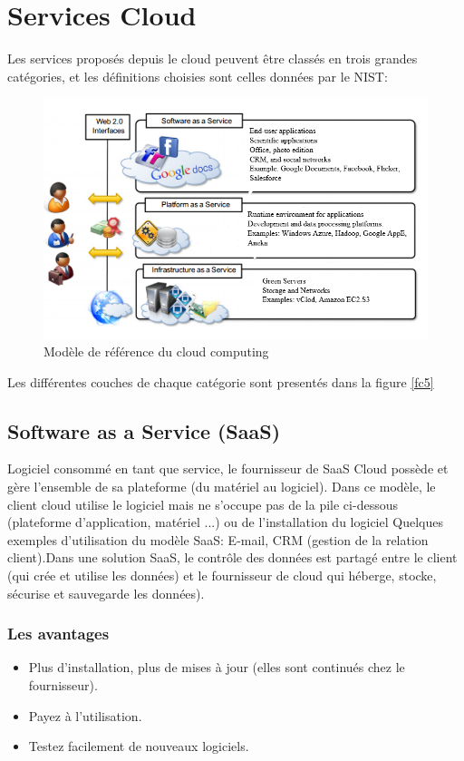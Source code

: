\section{Services Cloud}
Les services proposés depuis le cloud peuvent être classés en trois grandes catégories, et les définitions choisies sont celles données par le NIST:
\begin{figure}[H]
\centering
\includegraphics[scale=0.5]{chap1/fc4.png}
\caption{Modèle de référence du cloud computing}
\end{figure}

Les différentes couches de chaque catégorie sont presentés dans la figure \ref{fc5}

\subsection{Software as a Service (SaaS)}
Logiciel consommé en tant que service, le fournisseur de SaaS Cloud possède et gère l'ensemble de sa plateforme (du matériel au logiciel). Dans ce modèle, le client cloud utilise le logiciel mais ne s'occupe pas de la pile ci-dessous (plateforme d'application, matériel ...) ou de l'installation du logiciel Quelques exemples d'utilisation du modèle SaaS: E-mail, CRM (gestion de la relation client).Dans une solution SaaS, le contrôle des données est partagé entre le client (qui crée et utilise les données) et le fournisseur de cloud qui héberge, stocke, sécurise et sauvegarde les données).
\subsubsection{Les avantages}
\begin{itemize}
    \item Plus d'installation, plus de mises à jour (elles sont continués chez le fournisseur).
    \item Payez à l'utilisation.
    \item Testez facilement de nouveaux logiciels.
\end{itemize}
